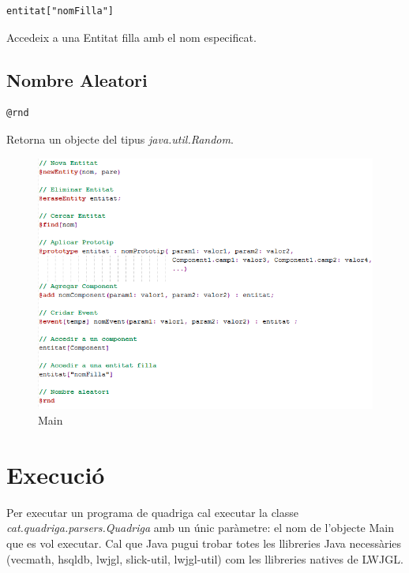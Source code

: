 \begin{verbatim}
entitat["nomFilla"]
\end{verbatim}

Accedeix a una Entitat filla amb el nom especificat.

\subsection{Nombre Aleatori}

\begin{verbatim}
@rnd
\end{verbatim}

Retorna un objecte del tipus {\em java.util.Random}.

\begin{figure}[h!]
  \includegraphics{./img/ExempleSentencies.png}
  \caption{Main \label{fig:ExempleSentencia}}
\end{figure}

\section{Execució}

Per executar un programa de quadriga cal executar la classe {\em cat.quadriga.parsers.Quadriga} amb un únic paràmetre: el nom de l'objecte Main que es vol executar. Cal que Java pugui trobar totes les llibreries Java necessàries (vecmath, hsqldb, lwjgl, slick-util, lwjgl-util) com les llibreries natives de LWJGL.